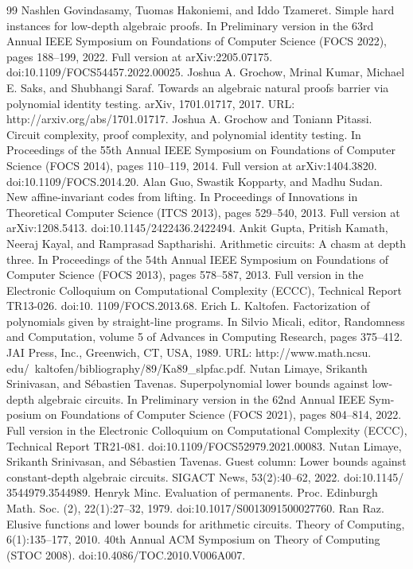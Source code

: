 \documentclass[10pt,a4paper]{article}
\begin{document}
\begin{thebibliography}{99}
 Nashlen Govindasamy, Tuomas Hakoniemi, and Iddo Tzameret. Simple hard instances for low-depth algebraic proofs. In Preliminary version in the 63rd Annual IEEE Symposium on Foundations of Computer Science (FOCS 2022), pages 188–199, 2022. Full version at arXiv:2205.07175. doi:10.1109/FOCS54457.2022.00025.
 Joshua A. Grochow, Mrinal Kumar, Michael E. Saks, and Shubhangi Saraf. Towards an algebraic natural proofs barrier via polynomial identity testing. arXiv, 1701.01717, 2017. URL: http://arxiv.org/abs/1701.01717.
 Joshua A. Grochow and Toniann Pitassi. Circuit complexity, proof complexity, and polynomial identity testing. In Proceedings of the 55th Annual IEEE Symposium on Foundations of Computer Science (FOCS 2014), pages 110–119, 2014. Full version at arXiv:1404.3820. doi:10.1109/FOCS.2014.20.
 Alan Guo, Swastik Kopparty, and Madhu Sudan. New affine-invariant codes from lifting. In Proceedings of Innovations in Theoretical Computer Science (ITCS 2013), pages 529–540, 2013. Full version at arXiv:1208.5413. doi:10.1145/2422436.2422494.
 Ankit Gupta, Pritish Kamath, Neeraj Kayal, and Ramprasad Saptharishi. Arithmetic circuits: A chasm at depth three. In Proceedings of the 54th Annual IEEE Symposium on Foundations of Computer Science (FOCS 2013), pages 578–587, 2013. Full version in the Electronic Colloquium on Computational Complexity (ECCC), Technical Report TR13-026. doi:10. 1109/FOCS.2013.68.
 Erich L. Kaltofen. Factorization of polynomials given by straight-line programs. In Silvio Micali, editor, Randomness and Computation, volume 5 of Advances in Computing Research, pages 375–412. JAI Press, Inc., Greenwich, CT, USA, 1989. URL: http://www.math.ncsu. edu/~kaltofen/bibliography/89/Ka89\_slpfac.pdf.
 Nutan Limaye, Srikanth Srinivasan, and Sébastien Tavenas. Superpolynomial lower bounds against low-depth algebraic circuits. In Preliminary version in the 62nd Annual IEEE Sym- posium on Foundations of Computer Science (FOCS 2021), pages 804–814, 2022. Full version in the Electronic Colloquium on Computational Complexity (ECCC), Technical Report TR21-081. doi:10.1109/FOCS52979.2021.00083.
 Nutan Limaye, Srikanth Srinivasan, and Sébastien Tavenas. Guest column: Lower bounds against constant-depth algebraic circuits. SIGACT News, 53(2):40–62, 2022. doi:10.1145/ 3544979.3544989.
 Henryk Minc. Evaluation of permanents. Proc. Edinburgh Math. Soc. (2), 22(1):27–32, 1979. doi:10.1017/S0013091500027760.
 Ran Raz. Elusive functions and lower bounds for arithmetic circuits. Theory of Computing, 6(1):135–177, 2010. 40th Annual ACM Symposium on Theory of Computing (STOC 2008). doi:10.4086/TOC.2010.V006A007.

\end{thebibliography}
\end{document}
